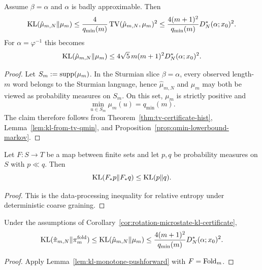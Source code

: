 \begin{corollary}\label{cor:rotation-microstate-kl-certificate}
Assume $\beta=\alpha$ and $\alpha$ is badly approximable.  Then
\[
\operatorname{KL}(\hat\mu_{m,N}\|\mu_m)
\le
\frac{4}{q_{\min}(m)}\operatorname{TV}(\hat\mu_{m,N},\mu_m)^2
\le
\frac{4(m+1)^2}{q_{\min}(m)}D_N^*(\alpha;x_0)^2.
\]
For $\alpha=\varphi^{-1}$ this becomes
\[
\operatorname{KL}(\hat\mu_{m,N}\|\mu_m)
\le
4\sqrt5\,m(m+1)^2 D_N^*(\alpha;x_0)^2.
\]
\end{corollary}

\begin{proof}
Let \(S_m:=\operatorname{supp}(\mu_m)\). In the Sturmian slice \(\beta=\alpha\), every
observed length-\(m\) word belongs to the Sturmian language, hence
\(\hat\mu_{m,N}\) and \(\mu_m\) may both be viewed as probability measures on
\(S_m\). On this set, \(\mu_m\) is strictly positive and
\[
\min_{u\in S_m}\mu_m(u)=q_{\min}(m).
\]
The claim therefore follows from Theorem~\ref{thm:tv-certificate-hist},
Lemma~\ref{lem:kl-from-tv-qmin}, and
Proposition~\ref{prop:qmin-lowerbound-markov}.
\end{proof}

\begin{lemma}\label{lem:kl-monotone-pushforward}
Let $F:S\to T$ be a map between finite sets and let $p,q$ be probability
measures on $S$ with $p\ll q$.  Then
\[
\operatorname{KL}(F_*p\|F_*q)\le \operatorname{KL}(p\|q).
\]
\end{lemma}

\begin{proof}
This is the data-processing inequality for relative entropy under deterministic
coarse graining.
\end{proof}

\begin{corollary}\label{cor:rotation-folded-kl-certificate}
Under the assumptions of
Corollary~\ref{cor:rotation-microstate-kl-certificate},
\[
\operatorname{KL}(\hat\pi_{m,N}\|\pi_m^{\mathrm{fold}})
\le
\operatorname{KL}(\hat\mu_{m,N}\|\mu_m)
\le
\frac{4(m+1)^2}{q_{\min}(m)}D_N^*(\alpha;x_0)^2.
\]
\end{corollary}

\begin{proof}
Apply Lemma~\ref{lem:kl-monotone-pushforward} with $F=\mathrm{Fold}_m$.
\end{proof}
